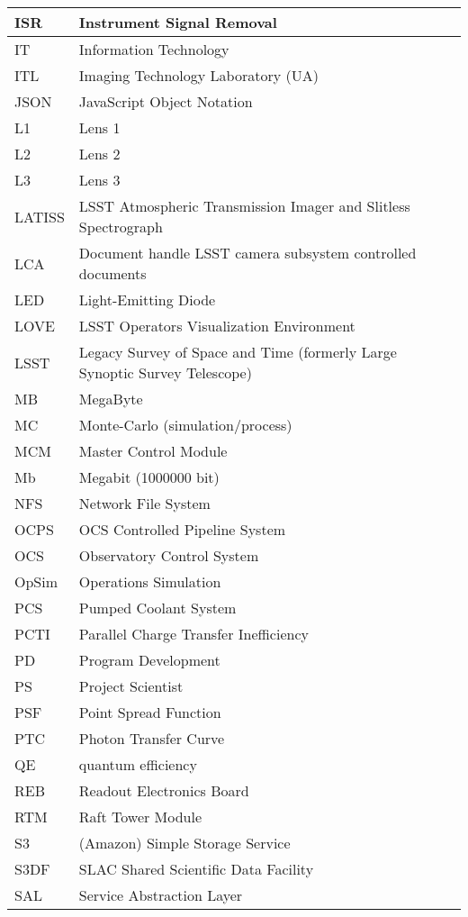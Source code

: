 \begin{longtable}{p{}p{}}
ISR & Instrument Signal Removal \\\hline
IT & Information Technology \\\hline
ITL & Imaging Technology Laboratory (UA) \\\hline
JSON & JavaScript Object Notation \\\hline
L1 & Lens 1 \\\hline
L2 & Lens 2 \\\hline
L3 & Lens 3 \\\hline
LATISS & LSST Atmospheric Transmission Imager and Slitless Spectrograph \\\hline
LCA & Document handle LSST camera subsystem controlled documents \\\hline
LED & Light-Emitting Diode \\\hline
LOVE & LSST Operators Visualization Environment \\\hline
LSST & Legacy Survey of Space and Time (formerly Large Synoptic Survey Telescope) \\\hline
MB & MegaByte \\\hline
MC & Monte-Carlo (simulation/process) \\\hline
MCM & Master Control Module \\\hline
Mb & Megabit (1000000 bit) \\\hline
NFS & Network File System \\\hline
OCPS & OCS Controlled Pipeline System \\\hline
OCS & Observatory Control System \\\hline
OpSim & Operations Simulation \\\hline
PCS & Pumped Coolant System \\\hline
PCTI & Parallel Charge Transfer Inefficiency \\\hline
PD & Program Development \\\hline
PS & Project Scientist \\\hline
PSF & Point Spread Function \\\hline
PTC & Photon Transfer Curve \\\hline
QE & quantum efficiency \\\hline
REB & Readout Electronics Board \\\hline
RTM & Raft Tower Module \\\hline
S3 & (Amazon) Simple Storage Service \\\hline
S3DF & SLAC Shared Scientific Data Facility \\\hline
SAL & Service Abstraction Layer \\\hline

\end{longtable}

